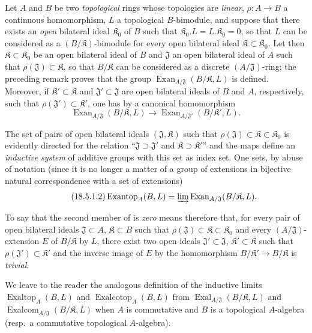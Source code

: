 \begin{env}[18.5.1]
\label{0.18.5.1}
Let $A$ and $B$ be two \emph{topological} rings whose topologies are \emph{linear}, $\rho:A\to B$ a continuous homomorphism, $L$ a topological $B$-bimodule, and suppose that there exists an \emph{open} bilateral ideal $\mathfrak K_0$ of $B$ such that $\mathfrak K_0.L=L.\mathfrak K_0=0$, so that $L$ can be
considered as a $(B/\mathfrak K)$-bimodule for every open bilateral ideal $\mathfrak K\subset\mathfrak K_0$.
Let then $\mathfrak K\subset\mathfrak K_0$ be an open bilateral ideal of $B$ and $\mathfrak{J}$ an open bilateral ideal of $A$ such that $\rho(\mathfrak{J})\subset\mathfrak K$, so that $B/\mathfrak K$ can be considered as a discrete $(A/\mathfrak{J})$-ring; the preceding remark proves that the group $\operatorname{Exan}_{A/\mathfrak{J}}(B/\mathfrak K,L)$ is defined.
Moreover, if $\mathfrak K'\subset\mathfrak K$ and $\mathfrak{J}'\subset\mathfrak{J}$ are open bilateral ideals of $B$ and $A$, respectively, such that $\rho(\mathfrak{J}')\subset\mathfrak K'$, one has by  a canonical homomorphism
\begin{equation}
\tag{18.5.1.1}
  \label{0.18.5.1.1}
  \operatorname{Exan}_{A/\mathfrak{J}}(B/\mathfrak K,L)\to\operatorname{Exan}_{A/\mathfrak{J}'}(B/\mathfrak K',L).
\end{equation}

The set of pairs of open bilateral ideals $(\mathfrak{J},\mathfrak K)$ such that $\rho(\mathfrak{J})\subset\mathfrak K\subset\mathfrak K_0$ is evidently directed for the relation ``$\mathfrak{J}\supset\mathfrak{J}'$ and $\mathfrak K\supset\mathfrak K'$'' and the maps  define an \emph{inductive system} of additive groups with this set as index set.
One sets, by abuse of notation (since it is no longer a matter of a group of extensions in bijective natural correspondence with a set of extensions)
\begin{equation}
\tag{18.5.1.2}
  \label{0.18.5.1.2}
  \operatorname{Exantop}_A(B,L)=\varinjlim\operatorname{Exan}_{A/\mathfrak{J}}(B/\mathfrak K,L).
\end{equation}

To say that the second member of  is \emph{zero} means therefore that, for every pair of open bilateral ideals $\mathfrak{J}\subset A$, $\mathfrak K\subset B$ such that $\rho(\mathfrak{J})\subset\mathfrak K\subset\mathfrak K_0$ and every $(A/\mathfrak{J})$-extension $E$ of $B/\mathfrak K$ by $L$, there exist two open ideals $\mathfrak{J}'\subset\mathfrak{J}$, $\mathfrak K'\subset\mathfrak K$ such that $\rho(\mathfrak{J}')\subset\mathfrak K'$ and the inverse image of $E$ by the homomorphism $B/\mathfrak K'\to B/\mathfrak K$ is \emph{trivial}.

We leave to the reader the analogous definition of the inductive limits $\operatorname{Exaltop}_A(B,L)$ and $\operatorname{Exalcotop}_A(B,L)$ from $\operatorname{Exal}_{A/\mathfrak{J}}(B/\mathfrak K,L)$ and $\operatorname{Exalcom}_{A/\mathfrak{J}}(B/\mathfrak K,L)$ when $A$ is commutative and $B$ is a topological $A$-algebra (resp.\ a commutative topological $A$-algebra).
\end{env}

